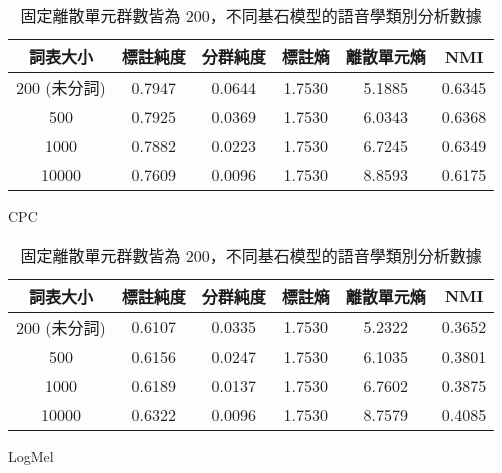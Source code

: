 \begin{table}[!htbp]
    \begin{subtable}[t]{\textwidth}
        \centering
        \begin{tabular}{|c|c|c|c|c|c|} \hline 
                詞表大小  & 標註純度 & 分群純度 & 標註熵 & 離散單元熵 &     NMI  \\ \hline 
200 (未分詞)&         0.7947 &   0.0644 &         1.7530 &     5.1885 &  0.6345 \\ \hline 
                    500 &  0.7925 &    0.0369 &   1.7530   & 6.0343 &    0.6368 \\ \hline %
                   1000 &  0.7882 &    0.0223 &   1.7530   & 6.7245 &    0.6349 \\ \hline %
                  10000 &  0.7609 &    0.0096 &   1.7530   & 8.8593 &    0.6175 \\ \hline %
        \end{tabular}
\caption{CPC}
        \label{tab:ch4-pcls-model-cpc}
    \end{subtable}        

    \jefftablesep        

    \begin{subtable}[t]{\textwidth}
        \centering
        \begin{tabular}{|c|c|c|c|c|c|} \hline 
        詞表大小 & 標註純度 & 分群純度 & 標註熵 & 離散單元熵 &     NMI \\ \hline 
200 (未分詞)&         0.6107 &   0.0335 &         1.7530 &     5.2322 &  0.3652 \\ \hline 
                    500 &  0.6156 &    0.0247 &   1.7530   & 6.1035 &    0.3801 \\ \hline %
                   1000 &  0.6189 &    0.0137 &   1.7530   & 6.7602 &    0.3875 \\ \hline %
                  10000 &  0.6322 &    0.0096 &   1.7530   & 8.7579 &    0.4085 \\ \hline %
        \end{tabular}
\caption{LogMel}
        \label{tab:ch4-pcls-model-logmel}
    \end{subtable}        

\caption{固定離散單元群數皆為 200，不同基石模型的語音學類別分析數據}
    \label{tab:ch4-models-pcls}
\end{table}

